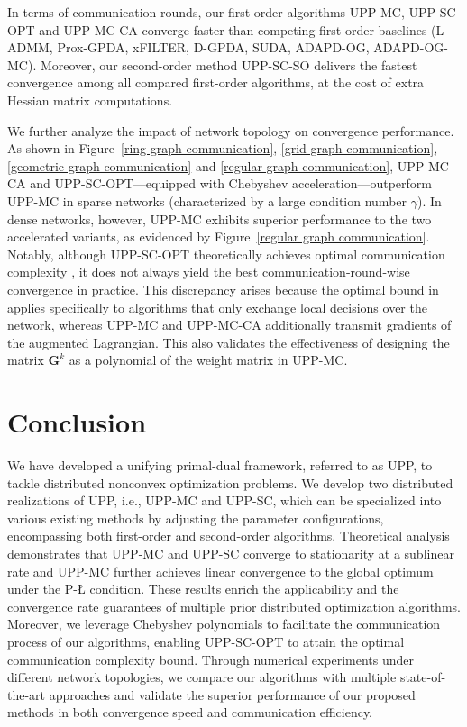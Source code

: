 \documentclass[12pt,draftcls,onecolumn]{IEEEtran}
\newcommand{\bG}{{\mathbf{G}}}
\begin{document}
In terms of communication rounds, our first-order algorithms UPP-MC, UPP-SC-OPT and UPP-MC-CA converge faster than competing first-order baselines (L-ADMM, Prox-GPDA, xFILTER, D-GPDA, SUDA, ADAPD-OG, ADAPD-OG-MC). Moreover, our second-order method UPP-SC-SO delivers the fastest convergence among all compared first-order algorithms, at the cost of extra Hessian matrix computations.

We further analyze the impact of network topology on convergence performance. As shown in Figure~\ref{ring graph communication}, \ref{grid graph communication}, \ref{geometric graph communication} and \ref{regular graph communication}, UPP-MC-CA and UPP-SC-OPT—equipped with Chebyshev acceleration—outperform UPP-MC in sparse networks (characterized by a large condition number $\gamma$). In dense networks, however, UPP-MC exhibits superior performance to the two accelerated variants, as evidenced by Figure~\ref{regular graph communication}.
Notably, although UPP-SC-OPT theoretically achieves optimal communication complexity \cite{sun_distributed_2019}, it does not always yield the best communication-round-wise convergence in practice. This discrepancy arises because the optimal bound in \cite{sun_distributed_2019} applies specifically to algorithms that only exchange local decisions over the network, whereas UPP-MC and UPP-MC-CA additionally transmit gradients of the augmented Lagrangian. This also validates the effectiveness of designing the matrix $\bG^k$ as a polynomial of the weight matrix in UPP-MC.

\section{Conclusion}\label{section: conclusion}
We have developed a unifying primal-dual framework, referred to as UPP, to tackle distributed nonconvex optimization problems. We develop two distributed realizations of UPP, i.e., UPP-MC and UPP-SC, which can be specialized into various existing methods by adjusting the parameter configurations, encompassing both first-order and second-order algorithms. Theoretical analysis demonstrates that UPP-MC and UPP-SC converge to stationarity at a sublinear rate and UPP-MC further achieves linear convergence to the global optimum under the P-{\L} condition. These results enrich the applicability and the convergence rate guarantees of multiple prior distributed optimization algorithms. Moreover, we leverage Chebyshev polynomials to facilitate the communication process of our algorithms, enabling UPP-SC-OPT to attain the optimal communication complexity bound. Through numerical experiments under different network topologies, we compare our algorithms with multiple state-of-the-art approaches and validate the superior performance of our proposed methods in both convergence speed and communication efficiency.
\end{document}
